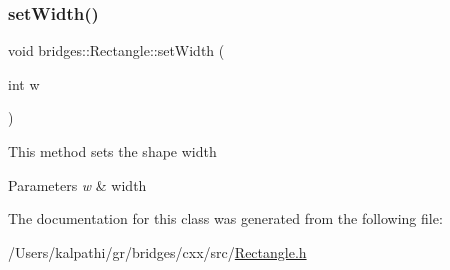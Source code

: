 \mbox{\label{classbridges_1_1_rectangle_ab592c45be7344b4a406d6332b392cb12}} 
\subsubsection{\texorpdfstring{setWidth()}{setWidth()}}
{\footnotesize\ttfamily void bridges\+::\+Rectangle\+::set\+Width (\begin{DoxyParamCaption}\item[{int}]{w }\end{DoxyParamCaption})\hspace{0.3cm}{\ttfamily [inline]}}

This method sets the shape width


\begin{DoxyParams}{Parameters}
{\em w} & width \\
\hline
\end{DoxyParams}


The documentation for this class was generated from the following file\+:\begin{DoxyCompactItemize}
\item 
/\+Users/kalpathi/gr/bridges/cxx/src/\mbox{\hyperlink{_rectangle_8h}{Rectangle.\+h}}\end{DoxyCompactItemize}
